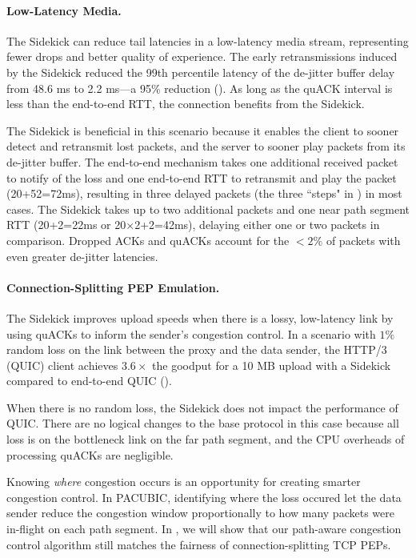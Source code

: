 \paragraph{Low-Latency Media.}
The Sidekick can reduce tail latencies in a low-latency media stream, representing
fewer drops and better quality of experience.
The early retransmissions induced by the Sidekick reduced the 99th percentile
latency of the de-jitter buffer delay from 48.6 ms to 2.2 ms---a 95\%
reduction ().
As long as the quACK interval is less than the end-to-end RTT, the connection
benefits from the Sidekick.

The Sidekick is beneficial in this scenario because it enables the client to sooner
detect and retransmit lost packets, and the server to sooner play packets from
its de-jitter buffer.
The end-to-end mechanism takes one additional received packet to notify of the
loss and
one end-to-end RTT to retransmit and play the packet (20+52=72ms), resulting in
three delayed packets (the three ``steps" in ) in most cases.
The Sidekick takes up to two additional packets and one near path segment RTT
(20+2=22ms or 20$\times$2+2=42ms), delaying either one or two packets in comparison.
Dropped ACKs and quACKs account for the $<2\%$ of packets with even greater
de-jitter latencies.

\paragraph{Connection-Splitting PEP Emulation.}
The Sidekick improves upload speeds when there is a lossy, low-latency link
by using quACKs to inform the sender's congestion control.
In a scenario with $1\%$ random loss on the link between the proxy and the
data sender, the HTTP/3 (QUIC) client achieves $3.6\times$ the goodput for a 10 MB
upload with a Sidekick compared to end-to-end QUIC ().

When there is no random loss, the Sidekick does not impact the performance
of QUIC\@.
There are no logical changes to the base protocol in this case because all loss
is on the
bottleneck link on the far path segment, and the CPU overheads of processing quACKs
are negligible.

Knowing \emph{where} congestion occurs is an opportunity for creating smarter
congestion control. In PACUBIC, identifying where the loss occured let the data
sender reduce the congestion window proportionally to how many packets were
in-flight on each path segment. In , we
will show that our path-aware congestion control algorithm still matches the
fairness of connection-splitting TCP PEPs.

